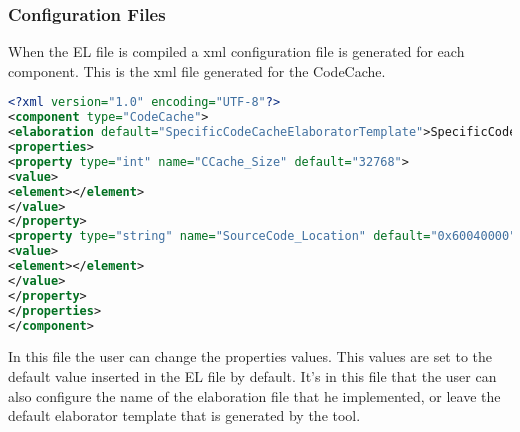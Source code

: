 \subsubsection{Configuration Files}
When the EL file is compiled a xml configuration file is generated for each component. This is the xml file generated for the CodeCache.
\begin{lstlisting}[caption={Code Cache xml file}, label={lst:codecachexml},language=xml]
<?xml version="1.0" encoding="UTF-8"?>
<component type="CodeCache">
<elaboration default="SpecificCodeCacheElaboratorTemplate">SpecificCodeCacheElaborator</elaboration>
<properties>
<property type="int" name="CCache_Size" default="32768">
<value>
<element></element>
</value>
</property>
<property type="string" name="SourceCode_Location" default="0x60040000">
<value>
<element></element>
</value>
</property>
</properties>
</component>
\end{lstlisting}

In this file the user can change the properties values. This values are set to the default value inserted in the EL file by default. It's in this file that the user can also configure the name of the elaboration file that he implemented, or leave the default elaborator template that is generated by the tool.



				
